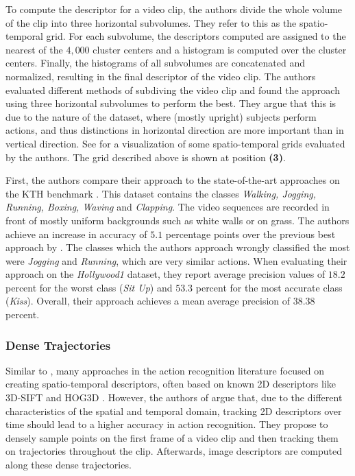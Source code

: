 To compute the descriptor for a video clip, the authors divide the whole volume of the clip into three horizontal subvolumes.
They refer to this as the spatio-temporal grid.
For each subvolume, the descriptors computed are assigned to the nearest of the $4,000$ cluster centers and a histogram is computed over the cluster centers.
Finally, the histograms of all subvolumes are concatenated and normalized, resulting in the final descriptor of the video clip.
The authors evaluated different methods of subdiving the video clip and found the approach using three horizontal subvolumes to perform the best.
They argue that this is due to the nature of the dataset, where (mostly upright) subjects perform actions, and thus distinctions in horizontal direction are more important than in vertical direction.
See  for a visualization of some spatio-temporal grids evaluated by the authors.
The grid described above is shown at position \textbf{(3)}.

First, the authors compare their approach to the state-of-the-art approaches on the KTH benchmark \cite{schuldt_recognizing_2004}.
This dataset contains the classes \textit{Walking, Jogging, Running, Boxing, Waving} and \textit{Clapping}.
The video sequences are recorded in front of mostly uniform backgrounds such as white walls or on grass.
The authors achieve an increase in accuracy of $5.1$ percentage points over the previous best approach by \cite{wong_extracting_2007}.
The classes which the authors approach wrongly classified the most were \textit{Jogging} and \textit{Running}, which are very similar actions.
When evaluating their approach on the \textit{Hollywood1} dataset, they report average precision values of $18.2$ percent for the worst class (\textit{Sit Up}) and $53.3$ percent for the most accurate class (\textit{Kiss}).
Overall, their approach achieves a mean average precision of $38.38$ percent.

\subsubsection{Dense Trajectories}
\label{sec:dense-trajectories}

Similar to \cite{laptev_learning_2008}, many approaches in the action recognition literature focused on creating spatio-temporal descriptors, often based on known 2D descriptors like 3D-SIFT \cite{scovanner_3d_sift} and HOG3D \cite{klaser_hog3d}.
However, the authors of \cite{wang_dense_2013} argue that, due to the different characteristics of the spatial and temporal domain, tracking 2D descriptors over time should lead to a higher accuracy in action recognition.
They propose to densely sample points on the first frame of a video clip and then tracking them on trajectories throughout the clip.
Afterwards, image descriptors are computed along these dense trajectories.

